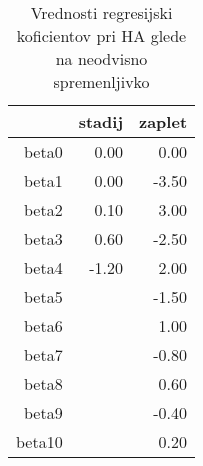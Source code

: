 \documentclass[letterpaper,11pt]{article}
\begin{document}
\begin{table}[ht]
\centering
\begin{tabular}{rrr}
  \hline
 & stadij & zaplet \\ 
  \hline
beta0 & 0.00 & 0.00 \\ 
  beta1 & 0.00 & -3.50 \\ 
  beta2 & 0.10 & 3.00 \\ 
  beta3 & 0.60 & -2.50 \\ 
  beta4 & -1.20 & 2.00 \\ 
  beta5 &  & -1.50 \\ 
  beta6 &  & 1.00 \\ 
  beta7 &  & -0.80 \\ 
  beta8 &  & 0.60 \\ 
  beta9 &  & -0.40 \\ 
  beta10 &  & 0.20 \\ 
   \hline
\end{tabular}
\caption{Vrednosti regresijski koficientov pri HA glede na neodvisno spremenljivko} 
\label{table:3}
\end{table}
\end{document}

